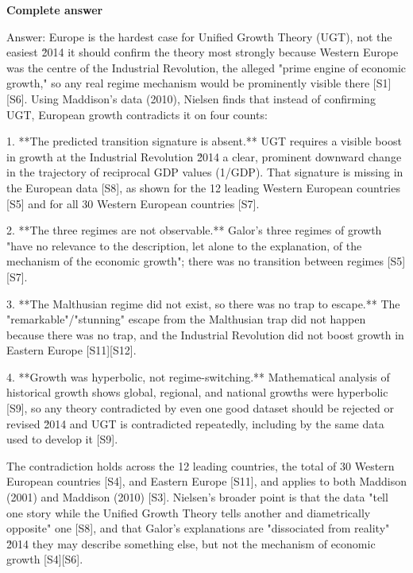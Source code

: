 \documentclass[10pt]{article}
\begin{document}
\textbf{Complete answer}
\begin{AnswerText}
Answer: Europe is the hardest case for Unified Growth Theory (UGT), not the easiest \u2014 it should confirm the theory most strongly because Western Europe was the centre of the Industrial Revolution, the alleged "prime engine of economic growth," so any real regime mechanism would be prominently visible there [S1][S6]. Using Maddison's data (2010), Nielsen finds that instead of confirming UGT, European growth contradicts it on four counts:

1. **The predicted transition signature is absent.** UGT requires a visible boost in growth at the Industrial Revolution \u2014 a clear, prominent downward change in the trajectory of reciprocal GDP values (1/GDP). That signature is missing in the European data [S8], as shown for the 12 leading Western European countries [S5] and for all 30 Western European countries [S7].

2. **The three regimes are not observable.** Galor's three regimes of growth "have no relevance to the description, let alone to the explanation, of the mechanism of the economic growth"; there was no transition between regimes [S5][S7].

3. **The Malthusian regime did not exist, so there was no trap to escape.** The "remarkable"/"stunning" escape from the Malthusian trap did not happen because there was no trap, and the Industrial Revolution did not boost growth in Eastern Europe [S11][S12].

4. **Growth was hyperbolic, not regime-switching.** Mathematical analysis of historical growth shows global, regional, and national growths were hyperbolic [S9], so any theory contradicted by even one good dataset should be rejected or revised \u2014 and UGT is contradicted repeatedly, including by the same data used to develop it [S9].

The contradiction holds across the 12 leading countries, the total of 30 Western European countries [S4], and Eastern Europe [S11], and applies to both Maddison (2001) and Maddison (2010) [S3]. Nielsen's broader point is that the data "tell one story while the Unified Growth Theory tells another and diametrically opposite" one [S8], and that Galor's explanations are "dissociated from reality" \u2014 they may describe something else, but not the mechanism of economic growth [S4][S6].
\end{AnswerText}
\end{document}
